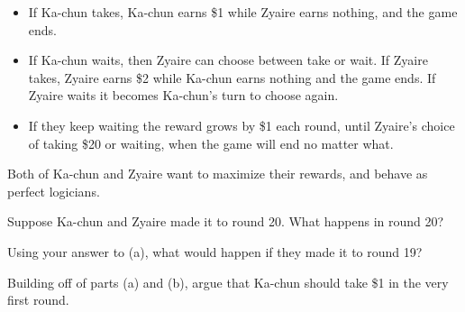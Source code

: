 \documentclass[12pt]{exam}
\begin{document}
\begin{itemize}
    \item If Ka-chun takes, Ka-chun earns \$1 while Zyaire earns nothing, and the game ends.
    \item If Ka-chun waits, then Zyaire can choose between take or wait. If Zyaire takes, Zyaire earns \$2 while Ka-chun earns nothing and the game ends. If Zyaire waits it becomes Ka-chun's turn to choose again.
    \item If they keep waiting the reward grows by \$1 each round, until Zyaire's choice of taking \$20 or waiting, when the game will end no matter what.
\end{itemize} Both of Ka-chun and Zyaire want to maximize their rewards, and behave as perfect logicians.

\begin{qparts}
    \item Suppose Ka-chun and Zyaire made it to round 20. What happens in round 20? 
    \item Using your answer to (a), what would happen if they made it to round 19?
    \item Building off of parts (a) and (b), argue that Ka-chun should take \$1 in the very first round.
\end{qparts}
\end{document}
